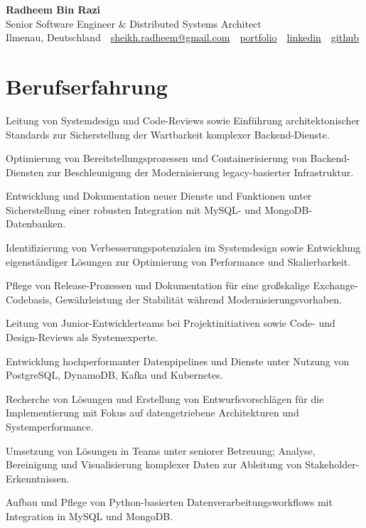 \documentclass[11pt,a4paper]{resume}
\makeatletter
\newcommand{\Portfolio}{https://radheem.github.io/my-cv}
\newcommand{\PortfolioText}{portfolio}
\newcommand{\GitHub}{https://github.com/radheem}
\newcommand{\LinkedIn}{https://www.linkedin.com/in/radheem-razi}
\newcommand{\Email}{sheikh.radheem@gmail.com}
\makeatother
\begin{document}
\clearpage
{}

\begin{center}
  {\huge\bfseries Radheem Bin Razi}\\[3pt]
  {\large Senior Software Engineer \& Distributed Systems Architect}\\[6pt]
  \small
  Ilmenau, Deutschland \,\textbar\,
  \href{mailto:\Email}{\Email} \,\textbar\,
  \href{\Portfolio}{\PortfolioText} \,\textbar\,
  \href{\LinkedIn}{linkedin} \,\textbar\,
  \href{\GitHub}{github}
\end{center}
\vspace{2pt}

\section{Berufserfahrung}

\bullets
  \item Leitung von Systemdesign und Code-Reviews sowie Einführung architektonischer Standards zur Sicherstellung der Wartbarkeit komplexer Backend-Dienste.
  \item Optimierung von Bereitstellungsprozessen und Containerisierung von Backend-Diensten zur Beschleunigung der Modernisierung legacy-basierter Infrastruktur.
  \item Entwicklung und Dokumentation neuer Dienste und Funktionen unter Sicherstellung einer robusten Integration mit MySQL- und MongoDB-Datenbanken.
\bulletsend
\vspace{3pt}
\bullets
  \item Identifizierung von Verbesserungspotenzialen im Systemdesign sowie Entwicklung eigenständiger Lösungen zur Optimierung von Performance und Skalierbarkeit.
  \item Pflege von Release-Prozessen und Dokumentation für eine großskalige Exchange-Codebasis, Gewährleistung der Stabilität während Modernisierungsvorhaben.
  \item Leitung von Junior-Entwicklerteams bei Projektinitiativen sowie Code- und Design-Reviews als Systemexperte.
  \item Entwicklung hochperformanter Datenpipelines und Dienste unter Nutzung von PostgreSQL, DynamoDB, Kafka und Kubernetes.
\bulletsend
\vspace{3pt}
\bullets
  \item Recherche von Lösungen und Erstellung von Entwurfsvorschlägen für die Implementierung mit Fokus auf datengetriebene Architekturen und Systemperformance.
  \item Umsetzung von Lösungen in Teams unter seniorer Betreuung; Analyse, Bereinigung und Visualisierung komplexer Daten zur Ableitung von Stakeholder-Erkenntnissen.
  \item Aufbau und Pflege von Python-basierten Datenverarbeitungsworkflows mit Integration in MySQL und MongoDB.
\bulletsend
\vspace{3pt}
\end{document}
